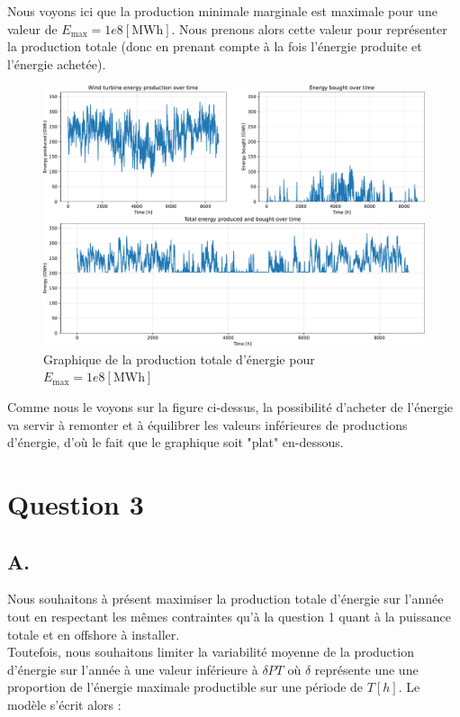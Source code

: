 \documentclass{article}
\begin{document}
\pagebreak

Nous voyons ici que la production minimale marginale est maximale pour une valeur de $E_{\text{max}} = 1e8 [\mathrm{MWh}]$.
Nous prenons alors cette valeur pour représenter la production totale (donc en prenant compte à la fois l'énergie produite et l'énergie achetée). 

\begin{figure}[ht!]
    \centering
    \includegraphics[scale=0.3]{Images/Partie_1/Q2/energy_produced_and_bought.pdf}
    \caption{Graphique de la production totale d'énergie pour $E_{\text{max}} = 1e8 [\mathrm{MWh}]$}
    \label{fig:total_energy_produced_and_bought_Q2}
\end{figure}
Comme nous le voyons sur la figure ci-dessus, la possibilité d'acheter de l'énergie va servir à remonter et à équilibrer les valeurs inférieures de productions d'énergie, d'où le fait que le graphique soit "plat" en-dessous.


\section*{Question 3}

\subsection*{A.}
Nous souhaitons à présent maximiser la production totale d'énergie sur l'année tout en respectant les mêmes contraintes qu'à la question 1 quant à la puissance totale et en offshore à installer.\\
Toutefois, nous souhaitons limiter la variabilité moyenne de la production d'énergie sur l'année à une valeur inférieure à $\delta P T$ où $\delta$ représente une une proportion de l'énergie maximale productible sur une période de $T [h]$. Le modèle s'écrit alors :
\end{document}
